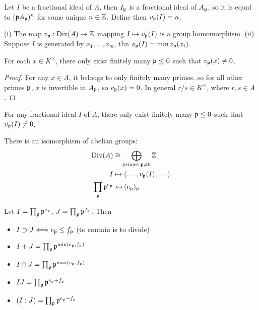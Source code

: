 \documentclass[11pt]{amsart}
\begin{document}
Let $I$ be a fractional ideal of $A$, then $I_{\mathfrak{p}}$ is a fractional ideal of $A_{\mathfrak{p}}$, so it is equal to $(\mathfrak{p} A_{\mathfrak{p}})^{n}$ for some unique $n\in\mathbb{Z}$. Define then $v_{\mathfrak{p}}(I) = n$.

\begin{prop}
(i) The map $v_{\mathfrak{p}}: \operatorname{Div}(A) \to \mathbb{Z}$ mapping $I\mapsto v_{\mathfrak{p}}(I)$ is a group homomorphism. 
(ii) Suppose $I$ is generated by $x_1,\dots,x_m$, thn $v_{\mathfrak{p}}(I) = \min v_{\mathfrak{p}}(x_i)$.
\end{prop}

\begin{cor}
For each $x\in K^{\times}$, there only exist finitely many $\mathfrak{p} \leq 0$ such that $v_{\mathfrak{p}}(x)\neq 0$.
\end{cor}

\begin{proof}
For any $x\in A$, it belongs to only finitely many primes, so for all other primes $\mathfrak{p}$, $x$ is invertible in $A_{\mathfrak{p}}$, so $v_{\mathfrak{p}}(x) = 0$. In general $r/s \in K^{\times}$, where $r,s\in A$.
\end{proof}

\begin{cor}
For any fractional ideal $I$ of $A$, there only exist finitely many $\mathfrak{p} \leq 0$ such that $v_{\mathfrak{p}}(I)\neq 0$.
\end{cor}

\begin{thm}
There is an isomorphism of abelian groups:
\begin{align*}
    \operatorname{Div}(A) &\cong \bigoplus_{\text{primes }\mathfrak{p} \neq 0} \mathbb{Z} \\
    I &\mapsto (\dots, v_{\mathfrak{p}}(I),\dots) \\
    \prod_{\mathfrak{p}} \mathfrak{p}^{e_{\mathfrak{p}}} &\mapsfrom (e_{\mathfrak{p}})_{\mathfrak{p}}
\end{align*}
\end{thm}

\begin{prop}
Let $I = \prod_{\mathfrak{p}} \mathfrak{p}^{e_{\mathfrak{p}}}$, $J = \prod_{\mathfrak{p}} \mathfrak{p}^{f_{\mathfrak{p}}}$. Then
\begin{itemize}
    \item $I \supset J \Longleftrightarrow e_{\mathfrak{p}} \le f_{\mathfrak{p}}$ (to contain is to divide)
    \item $I + J = \prod_{\mathfrak{p}} \mathfrak{p}^{\min(e_{\mathfrak{p}}, f_{\mathfrak{p}})}$
    \item $I \cap J = \prod_{\mathfrak{p}} \mathfrak{p}^{\max(e_{\mathfrak{p}}, f_{\mathfrak{p}})}$
    \item $IJ = \prod_{\mathfrak{p}} \mathfrak{p}^{e_{\mathfrak{p}} + f_{\mathfrak{p}}}$
    \item $(I:J) = \prod_{\mathfrak{p}} \mathfrak{p}^{e_{\mathfrak{p}} - f_{\mathfrak{p}}}$
\end{itemize}
\end{prop}
\end{document}
